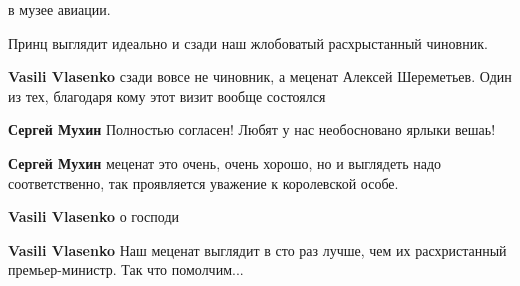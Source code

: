  
 
 
 
 

в музее авиации.

Принц выглядит идеально и сзади наш жлобоватый расхрыстанный чиновник.

\textbf{Vasili Vlasenko} сзади вовсе не чиновник, а меценат Алексей Шереметьев. Один из тех, благодаря кому этот визит вообще состоялся

\textbf{Сергей Мухин} Полностью согласен! Любят у нас необосновано ярлыки вешаь!

\textbf{Сергей Мухин} меценат это очень, очень хорошо, но и выглядеть надо соответственно, так проявляется уважение к королевской особе.

\textbf{Vasili Vlasenko} о господи

\textbf{Vasili Vlasenko} Наш меценат выглядит в сто раз лучше, чем их расхристанный премьер-министр. Так что помолчим...
